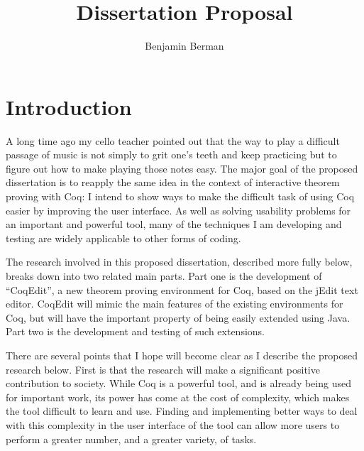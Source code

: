 \documentclass[11pt]{amsart}
\title{Dissertation Proposal}
\author{Benjamin Berman}
\begin{document}
\maketitle
\section{Introduction}

A long time ago my cello teacher pointed out that the way to play a difficult passage of music is not simply to grit one's teeth and keep practicing but to figure out how to make playing those notes easy.  The major goal of the proposed dissertation is to reapply the same idea in the context of interactive theorem proving with Coq:  I intend to show ways to make the difficult task of using Coq easier by improving the user interface.  As well as solving usability problems for an important and powerful tool, many of the techniques I am developing and testing are widely applicable to other forms of coding.

The research involved in this proposed dissertation, described more fully below, breaks down into two related main parts.  Part one is the development of ``CoqEdit'', a new theorem proving environment for Coq, based on the jEdit text editor.  CoqEdit will mimic the main features of the existing environments for Coq, but will have the important property of being easily extended using Java.  Part two is the development and testing of such extensions.

There are several points that I hope will become clear as I describe the proposed research below.  First is that the research will make a significant positive contribution to society.  While Coq is a powerful tool, and is already being used for important work, its power has come at the cost of complexity, which makes the tool difficult to learn and use.  Finding and implementing better ways to deal with this complexity in the user interface of the tool can allow more users to perform a greater number, and a greater variety, of tasks.  
	
\end{document}
